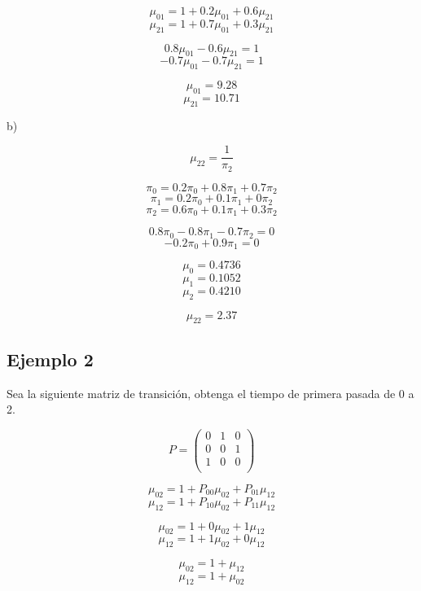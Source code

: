 \documentclass{article}
\begin{document}
\[\mu_{01} = 1 + 0.2\mu_{01} + 0.6\mu_{21}\]
\[\mu_{21} = 1 + 0.7\mu_{01} + 0.3\mu_{21}\]

\[0.8\mu_{01} - 0.6\mu_{21} = 1\]
\[-0.7\mu_{01} - 0.7\mu_{21} = 1\]

\[\mu_{01} = 9.28\]
\[\mu_{21} = 10.71\]

b)

\[\mu_{22} = \frac{1}{\pi_2}\]

\[\pi_{0} = 0.2\pi_{0} + 0.8\pi_{1} + 0.7\pi_{2}\]
\[\pi_{1} = 0.2\pi_{0} + 0.1\pi_{1} + 0\pi_{2}\]
\[\pi_{2} = 0.6\pi_{0} + 0.1\pi_{1} + 0.3\pi_{2}\]

\[0.8\pi_0 - 0.8\pi_1 -0.7\pi_2 = 0\]
\[-0.2\pi_0 + 0.9\pi_1 = 0\]

\[\mu_0 = 0.4736\]
\[\mu_1 = 0.1052\]
\[\mu_2 = 0.4210\]

\[\mu_{22} = 2.37\]

\subsection*{Ejemplo 2}

Sea la siguiente matriz de transición, obtenga el tiempo de primera pasada de 0 a 2.

\[
    P = \begin{pmatrix}
        0 & 1 & 0 \\
        0 & 0 & 1 \\
        1 & 0 & 0 \\
    \end{pmatrix}
\]

\[\mu_{02} = 1 + P_{00}\mu_{02} + P_{01}\mu_{12}\]
\[\mu_{12} = 1 + P_{10}\mu_{02} + P_{11}\mu_{12}\]

\[\mu_{02} = 1 + 0\mu_{02} + 1\mu_{12}\]
\[\mu_{12} = 1 + 1\mu_{02} + 0\mu_{12}\]

\[\mu_{02} = 1 + \mu_{12}\]
\[\mu_{12} = 1 + \mu_{02}\]
\end{document}
